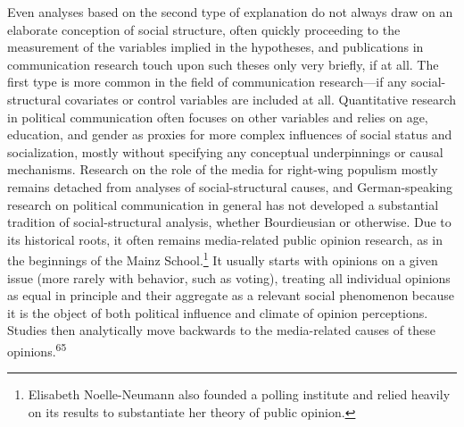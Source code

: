 \documentclass{tufte-handout}
\begin{document}
Even analyses based on the second type of explanation do not always draw
on an elaborate conception of social structure, often quickly proceeding
to the measurement of the variables implied in the hypotheses, and
publications in communication research touch upon such theses only very
briefly, if at all. The first type is more common in the field of
communication research---if any social-structural covariates or control
variables are included at all. Quantitative research in political
communication often focuses on other variables and relies on age,
education, and gender as proxies for more complex influences of social
status and socialization, mostly without specifying any conceptual
underpinnings or causal mechanisms. Research on the role of the media
for right-wing populism mostly remains detached from analyses of
social-structural causes, and German-speaking research on political
communication in general has not developed a substantial tradition of
social-structural analysis, whether Bourdieusian or otherwise. Due to
its historical roots, it often remains media-related public opinion
research, as in the beginnings of the Mainz School.\footnote{Elisabeth
  Noelle-Neumann also founded a polling institute and relied heavily on
  its results to substantiate her theory of public opinion.} It usually
starts with opinions on a given issue (more rarely with behavior, such
as voting), treating all individual opinions as equal in principle and
their aggregate as a relevant social phenomenon because it is the object
of both political influence and climate of opinion perceptions. Studies
then analytically move backwards to the media-related causes of these
opinions.\textsuperscript{65}
\end{document}
